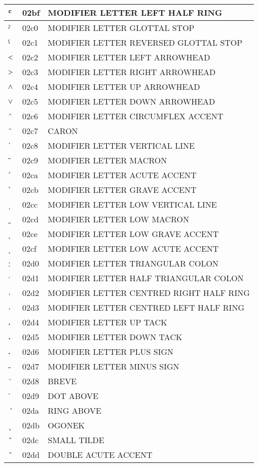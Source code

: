 \documentclass[12pt,letterpaper,openany]{book}
\begin{document}
\begin{center}
\begin{supertabular}{|m{0.25in}|m{0.5in}|m{4in}|}
ʿ & 02bf & MODIFIER LETTER LEFT HALF RING\\\hline
ˀ & 02c0 & MODIFIER LETTER GLOTTAL STOP\\\hline
ˁ & 02c1 & MODIFIER LETTER REVERSED GLOTTAL STOP\\\hline
˂ & 02c2 & MODIFIER LETTER LEFT ARROWHEAD\\\hline
˃ & 02c3 & MODIFIER LETTER RIGHT ARROWHEAD\\\hline
˄ & 02c4 & MODIFIER LETTER UP ARROWHEAD\\\hline
˅ & 02c5 & MODIFIER LETTER DOWN ARROWHEAD\\\hline
ˆ & 02c6 & MODIFIER LETTER CIRCUMFLEX ACCENT\\\hline
ˇ & 02c7 & CARON\\\hline
ˈ & 02c8 & MODIFIER LETTER VERTICAL LINE\\\hline
ˉ & 02c9 & MODIFIER LETTER MACRON\\\hline
ˊ & 02ca & MODIFIER LETTER ACUTE ACCENT\\\hline
ˋ & 02cb & MODIFIER LETTER GRAVE ACCENT\\\hline
ˌ & 02cc & MODIFIER LETTER LOW VERTICAL LINE\\\hline
ˍ & 02cd & MODIFIER LETTER LOW MACRON\\\hline
ˎ & 02ce & MODIFIER LETTER LOW GRAVE ACCENT\\\hline
ˏ & 02cf & MODIFIER LETTER LOW ACUTE ACCENT\\\hline
ː & 02d0 & MODIFIER LETTER TRIANGULAR COLON\\\hline
ˑ & 02d1 & MODIFIER LETTER HALF TRIANGULAR COLON\\\hline
˒ & 02d2 & MODIFIER LETTER CENTRED RIGHT HALF RING\\\hline
˓ & 02d3 & MODIFIER LETTER CENTRED LEFT HALF RING\\\hline
˔ & 02d4 & MODIFIER LETTER UP TACK\\\hline
˕ & 02d5 & MODIFIER LETTER DOWN TACK\\\hline
˖ & 02d6 & MODIFIER LETTER PLUS SIGN\\\hline
˗ & 02d7 & MODIFIER LETTER MINUS SIGN\\\hline
˘ & 02d8 & BREVE\\\hline
˙ & 02d9 & DOT ABOVE\\\hline
˚ & 02da & RING ABOVE\\\hline
˛ & 02db & OGONEK\\\hline
˜ & 02dc & SMALL TILDE\\\hline
˝ & 02dd & DOUBLE ACUTE ACCENT\\\hline

\end{supertabular}
\end{center}
\end{document}
